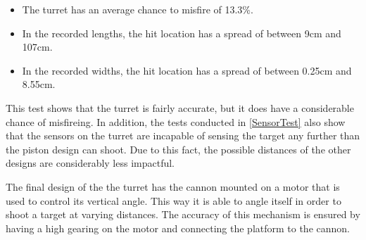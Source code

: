 \begin{itemize}
  \item The turret has an average chance to misfire of 13.3\%.
  \item In the recorded lengths, the hit location has a spread of between 9cm
  and 107cm.
  \item In the recorded widths, the hit location has a spread of between 0.25cm
  and 8.55cm.
\end{itemize}

This test shows that the turret is fairly accurate, but it does have a
considerable chance of misfireing. In addition, the tests conducted in
\autoref{SensorTest} also show that the sensors on the turret are incapable
of sensing the target any further than the piston design can shoot. Due to this
fact, the possible distances of the other designs are considerably less
impactful.\nl

The final design of the the turret has the cannon mounted on a motor that is
used to control its vertical angle. This way it is able to angle itself in order
to shoot a target at varying distances. The accuracy of this mechanism is
ensured by having a high gearing on the motor and connecting the
platform to the cannon.



